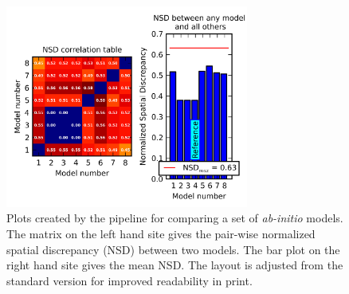 \documentclass[preprint,pdf]{iucr}              %
\begin{document}
\begin{figure}
\centering
\includegraphics[width=8cm]{nsd.png}
\caption{Plots created by the pipeline for comparing a set of \textit{ab-initio} models. 
The matrix on the left hand site gives the pair-wise normalized spatial discrepancy (NSD) between two models. The bar plot on the right hand site gives the mean NSD. 
The layout is adjusted from the standard version for improved readability in
print.}
\label{fgr:nsd}
\end{figure}
\end{document}
